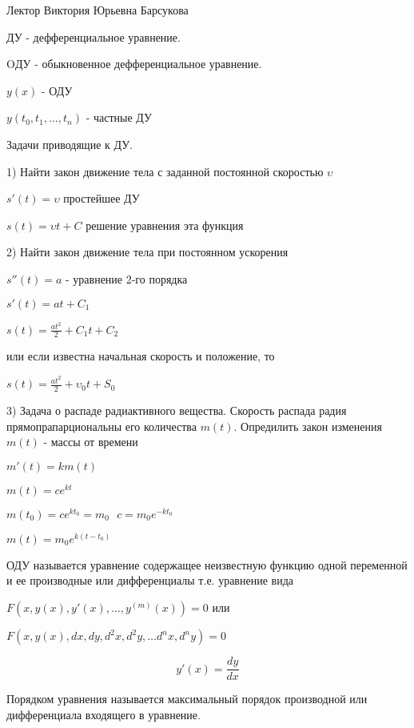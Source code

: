Лектор Виктория Юрьевна Барсукова

ДУ - дефференциальное уравнение.

OДУ - обыкновенное дефференциальное уравнение.

$y(x)$ - ОДУ

$y(t_0, t_1, \ldots, t_n)$ - частные ДУ

\begin{title}[\Large]
  Задачи приводящие к ДУ.
\end{title}

1) Найти закон движение тела с заданной постоянной скоростью $\upsilon$

$s' (t) = \upsilon$ простейшее ДУ

$s (t) = \upsilon t + C$ решение уравнения эта функция

2) Найти закон движение тела при постоянном ускорения

$s'' (t) = a$ - уравнение 2-го порядка

$s'(t) = at + C_1$

$s(t) = \frac{at^2}{2} + C_1 t + C_2$

или если известна начальная скорость и положение, то

$s(t) = \frac{at^2}{2} + \upsilon_0 t + S_0$

3) Задача о распаде радиактивного вещества. Скорость распада радия
прямопрапарциональны его количества $m(t)$. Опредилить закон изменения
$m(t)$ - массы от времени

$m'(t) = k m(t)$

$m(t) = c e^{kt}$

$m(t_0) = c e^{kt_0} = m_0 ~~~ c = m_0 e^{-kt_0}$

$m(t) = m_0e^{k(t-t_0)}$

\begin{define}
  ОДУ называется уравнение содержащее неизвестную функцию одной переменной и ее
  производные или дифференциалы т.е. уравнение вида

  $F(x, y(x), y'(x), \ldots, y^{(m)} (x)) = 0$ или


  $F(x, y(x), dx, dy, d^2 x, d^2 y, \ldots d^n x, d^n y) = 0$

  $$
  y'(x) = \frac{dy}{dx}
  $$
\end{define}

\begin{define}
  Порядком уравнения называется максимальный порядок производной или
  дифференциала входящего в уравнение.
\end{define}

